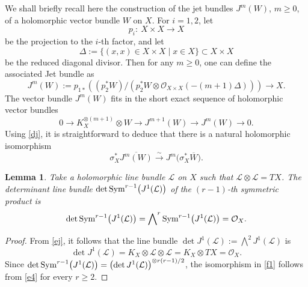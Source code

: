 \documentclass[pdftex]{sigma}
\numberwithin{equation}{section}
\newtheorem{Lemma}[Theorem]{Lemma}
\begin{document}
We shall briefly recall here the construction of the jet bundles $J^m(W)$, $m \geq 0$, of
a holomorphic vector bundle $W$ on $X$. For $i = 1, 2$, let
\begin{equation}\label{z1}
p_i\colon\ X\times X \longrightarrow X
\end{equation}
be the projection to the $i$-th factor, and let
\begin{equation}\label{z2}
\Delta := \{(x, x) \in X\times X \mid x \in X\} \subset X\times X
\end{equation}
be the reduced diagonal divisor. Then for any $m \geq 0$, one can define the associated Jet bundle as
\begin{equation}\label{dj}
J^m(W) := p_{1*}((p^*_2W)/(p^*_2W\otimes
{\mathcal O}_{X\times X}(-(m+1)\Delta))) \longrightarrow X.
\end{equation}
The vector bundle $J^m(W)$ fits in the short exact sequence of holomorphic vector bundles
\begin{equation}\label{ej}
0 \longrightarrow K^{\otimes (m+1)}_X\otimes W \longrightarrow J^{m+1}(W)
 \longrightarrow J^m(W) \longrightarrow 0.
\end{equation}
Using \eqref{dj}, it is straightforward to deduce that there is a natural holomorphic
isomorphism
\begin{equation}\label{dj2}
\sigma^*_X \overline{J^m(W)} \stackrel{\sim}{\longrightarrow}
J^m\bigl(\sigma^*_X\overline{W}\bigr).
\end{equation}

\begin{Lemma}\label{4.7}
Take a holomorphic line bundle $\mathcal L$ on $X$ such that ${\mathcal L}\otimes{\mathcal L} = TX$. The determinant
line bundle $\det {\rm Sym}^{r-1}\bigl(J^1(\mathcal L)\bigr)$ of the $(r-1)$-th symmetric product is
\begin{equation}\label{f1}
\det {\rm Sym}^{r-1}\bigl(J^1(\mathcal L)\bigr) = \bigwedge\nolimits^r {\rm Sym}^{r-1}\bigl(J^1(\mathcal L)\bigr)
 = {\mathcal O}_X.
\end{equation}
\end{Lemma}

\begin{proof}
{}From \eqref{ej}, it follows that the line bundle $\det J^1(\mathcal L) :=
\bigwedge^2 J^1(\mathcal L)$ is
\begin{equation}\label{e4}
\det J^1(\mathcal L) = K_X\otimes {\mathcal L}\otimes {\mathcal L} = K_X\otimes TX = {\mathcal O}_X.
\end{equation}
Since $\det {\rm Sym}^{r-1}\bigl(J^1(\mathcal L)\bigr) = \bigl(\det J^1(\mathcal L)\bigr)^{\otimes r(r-1)/2}$, the
isomorphism in \eqref{f1} follows from \eqref{e4} for every $r \geq 2$.
\end{proof}
\end{document}

